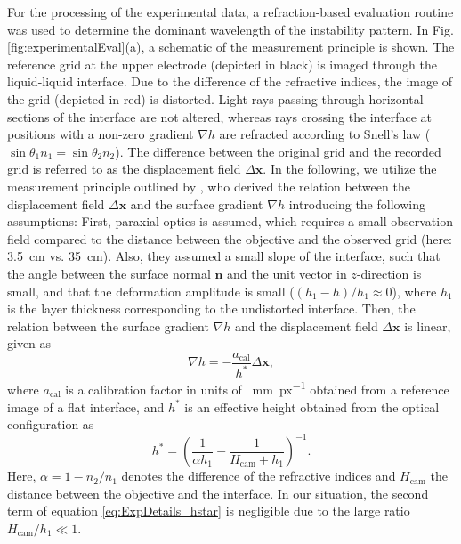 \documentclass{jfm_arxiv}
\renewcommand\vec{\mathbf}
\begin{document}
For the processing of the experimental data, a refraction-based evaluation routine was used to determine the dominant wavelength of the instability pattern. In Fig. \ref{fig:experimentalEval}(a), a schematic of the measurement principle is shown. The reference grid at the upper electrode (depicted in black) is imaged through the liquid-liquid interface.
Due to the difference of the refractive indices, the image of the grid (depicted in red) is distorted. Light rays passing through horizontal sections of the interface are not altered, whereas rays crossing the interface at positions with a non-zero gradient $\nabla h$ are refracted according to Snell's law ($\sin \theta_1 n_1 = \sin \theta_2 n_2$). The difference between the original grid and the recorded grid is referred to as the displacement field $\Delta \vec{x}$. In the following, we utilize the measurement principle outlined by \citet{Moisy2009}, who derived the relation between the displacement field $\Delta \vec{x}$ and the surface gradient $\nabla h$ introducing the following assumptions: First, paraxial optics is assumed, which requires a small observation field compared to the distance between the objective and the observed grid (here: \SI{3.5}{\centi\meter} vs. \SI{35}{\centi\meter}). Also, they assumed a small slope of the interface, such that the angle between the surface normal $\vec{n}$ and the unit vector in $z$-direction is small, and that the deformation amplitude is small ($\left(h_1-h\right)/h_1 \approx 0$), where $h_1$ is the layer thickness corresponding to the undistorted interface. Then, the relation between the surface gradient $\nabla h$ and the displacement field $\Delta \vec{x}$ is linear, given as 
\begin{equation}
\label{eq:ExpDetails_h_gradient}
\nabla h = -\frac{a_\text{cal}}{h^*} \Delta \vec{x},
\end{equation}
where $a_\text{cal}$ is a calibration factor in units of \SI{}{\milli\meter\per px} obtained from a reference image of a flat interface, and $h^*$ is an effective height obtained from the optical configuration as 
\begin{equation}
\label{eq:ExpDetails_hstar}
h^* = \left( \frac{1}{\alpha h_1}-\frac{1}{H_\text{cam} + h_1} \right)^{-1}. 
\end{equation}
Here, $\alpha = 1-n_2/n_1$ denotes the difference of the refractive indices and $H_\text{cam}$ the distance between the objective and the interface. In our situation, the second term of equation \eqref{eq:ExpDetails_hstar} is negligible due to the large ratio $H_\text{cam}/h_1\ll1$.
\end{document}
